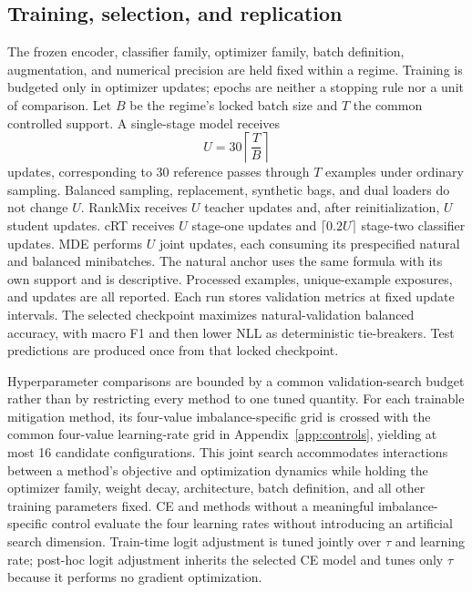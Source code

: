 \documentclass[11pt]{article}
\begin{document}
\subsection{Training, selection, and replication}
\label{sec:training}
The frozen encoder, classifier family, optimizer family, batch definition, augmentation, and numerical precision are held fixed within a regime. Training is budgeted only in optimizer updates; epochs are neither a stopping rule nor a unit of comparison. Let $B$ be the regime's locked batch size and $T$ the common controlled support. A single-stage model receives
\begin{equation}
  U=30\left\lceil\frac{T}{B}\right\rceil
  \label{eq:update-budget}
\end{equation}
updates, corresponding to 30 reference passes through $T$ examples under ordinary sampling. Balanced sampling, replacement, synthetic bags, and dual loaders do not change $U$. RankMix receives $U$ teacher updates and, after reinitialization, $U$ student updates. cRT receives $U$ stage-one updates and $\lceil0.2U\rceil$ stage-two classifier updates. MDE performs $U$ joint updates, each consuming its prespecified natural and balanced minibatches. The natural anchor uses the same formula with its own support and is descriptive. Processed examples, unique-example exposures, and updates are all reported. Each run stores validation metrics at fixed update intervals. The selected checkpoint maximizes natural-validation balanced accuracy, with macro F1 and then lower NLL as deterministic tie-breakers. Test predictions are produced once from that locked checkpoint.

Hyperparameter comparisons are bounded by a common validation-search budget rather than by restricting every method to one tuned quantity. For each trainable mitigation method, its four-value imbalance-specific grid is crossed with the common four-value learning-rate grid in Appendix~\ref{app:controls}, yielding at most 16 candidate configurations. This joint search accommodates interactions between a method's objective and optimization dynamics while holding the optimizer family, weight decay, architecture, batch definition, and all other training parameters fixed. CE and methods without a meaningful imbalance-specific control evaluate the four learning rates without introducing an artificial search dimension. Train-time logit adjustment is tuned jointly over $\tau$ and learning rate; post-hoc logit adjustment inherits the selected CE model and tunes only $\tau$ because it performs no gradient optimization.
\end{document}
